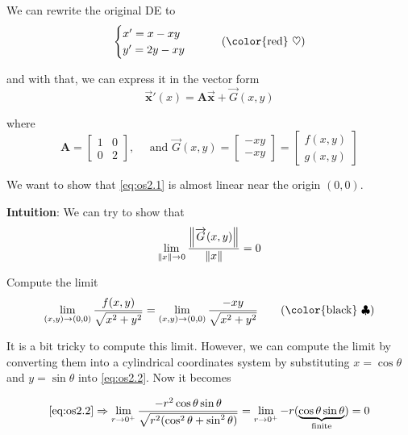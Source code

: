 \begin{solution}
    We can rewrite the original DE to
    \begin{equation*}
        \begin{cases}
            x' = x-xy\\
            y' = 2y-xy
        \end{cases} \label{eq:os2.1} \tag{{\color{red} $\heartsuit  $}}
    \end{equation*}

    and with that, we can express it in the vector form
    \[
        \overrightarrow{\mathbf{x}}'(x) = \mathbf{A}\overrightarrow{\mathbf{x}} + \overrightarrow{G}(x,y)
    \]
    
    where
    \[
        \mathbf{A} = \begin{bmatrix}
            1 & 0\\ 0 & 2
        \end{bmatrix}, \quad \text{ and }
        \overrightarrow{G}(x,y) = \begin{bmatrix}
            -xy \\ -xy 
        \end{bmatrix}
        = \begin{bmatrix}
            f(x,y) \\ g(x,y)
        \end{bmatrix}
    \]

    We want to show that \eqref{eq:os2.1} is almost linear near the origin $(0,0)$.
    
    \textbf{Intuition}: We can try to show that
    \begin{equation*}
        \lim_{\left\lVert x\right\rVert \to 0} \frac{\left\lVert\overrightarrow{G}(x,y)\right\rVert}{\left\lVert x\right\rVert} = 0
    \end{equation*}

    Compute the limit
    \begin{equation*}
        \lim_{(x,y) \to (0, 0)} \frac{f(x,y)}{\sqrt{x^2 + y^2}} = \lim_{(x,y) \to (0, 0)} \frac{-xy}{\sqrt{x^2 + y^2}} 
        \label{eq:os2.2} \tag{{\color{black} $\clubsuit$}}
    \end{equation*}

    It is a bit tricky to compute this limit. However, we can compute the limit by converting them into a cylindrical coordinates system 
    by substituting $x = \cos \theta$ and $y = \sin \theta$ into \eqref{eq:os2.2}. Now it becomes

    \begin{equation*}
        \eqref{eq:os2.2} \Rightarrow \lim_{r \to 0^+} \frac{-r^2 \cos \theta \sin \theta}{\sqrt{r^2(\cos^2 \theta + \sin^2 \theta)}} = \lim_{r \to 0^+} -r(\underbrace{\cos \theta \sin \theta}_\text{finite}) = 0
    \end{equation*}


\end{solution}
